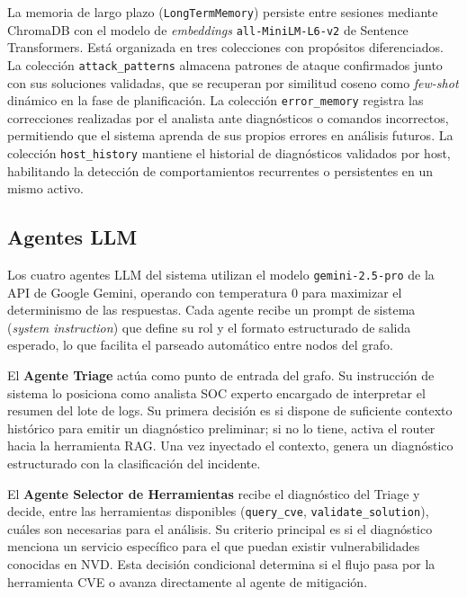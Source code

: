 La memoria de largo plazo (\texttt{LongTermMemory})
persiste entre sesiones mediante ChromaDB con el modelo de
\textit{embeddings} \texttt{all-MiniLM-L6-v2} de Sentence Transformers.
Está organizada en tres colecciones con propósitos
diferenciados. La colección \texttt{attack\_patterns} almacena
patrones de ataque confirmados junto con sus soluciones
validadas, que se recuperan por similitud coseno como
\textit{few-shot} dinámico en la fase de planificación. La
colección \texttt{error\_memory} registra las correcciones
realizadas por el analista ante diagnósticos o comandos
incorrectos, permitiendo que el sistema aprenda de sus propios
errores en análisis futuros. La colección
\texttt{host\_history} mantiene el historial de diagnósticos
validados por host, habilitando la detección de comportamientos
recurrentes o persistentes en un mismo activo.

\subsection{Agentes LLM}

Los cuatro agentes LLM del sistema utilizan el modelo
\texttt{gemini-2.5-pro} de la API de Google Gemini,
operando con temperatura 0 para maximizar el determinismo de
las respuestas. Cada agente recibe un prompt de sistema
(\textit{system instruction}) que define su rol y el formato
estructurado de salida esperado, lo que facilita el parseado automático entre nodos del grafo.

El \textbf{Agente Triage} actúa como punto de entrada del
grafo. Su instrucción de sistema lo posiciona como analista SOC
experto encargado de interpretar el resumen del lote de logs.
Su primera decisión es si dispone de suficiente contexto
histórico para emitir un diagnóstico preliminar; si no lo
tiene, activa el router hacia la herramienta RAG. Una vez
inyectado el contexto, genera un diagnóstico estructurado con
la clasificación del incidente.

El \textbf{Agente Selector de Herramientas} recibe el
diagnóstico del Triage y decide, entre las herramientas
disponibles (\texttt{query\_cve}, \texttt{validate\_solution}),
cuáles son necesarias para el análisis. Su criterio principal
es si el diagnóstico menciona un servicio específico para el
que puedan existir vulnerabilidades conocidas en NVD. Esta
decisión condicional determina si el flujo pasa por la
herramienta CVE o avanza directamente al agente de mitigación.

